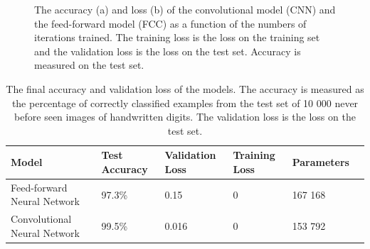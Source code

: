 \documentclass[a4paper, twoside]{article}
\begin{document}
\begin{figure}[h]
    \centering
    \caption{The accuracy (a) and loss (b) of the convolutional model (CNN) and the feed-forward model (FCC) as a function of the numbers of iterations trained. The training loss is the loss on the training set and the validation loss is the loss on the test set. Accuracy is measured on the test set.} \label{figaccloss}
    
\end{figure}
\begin{table}[h]
\begin{center}
    \begin{tabular}{| l | l | l | l | l | l |}
    \hline
    Model & Test Accuracy & Validation Loss & Training Loss & Parameters\\ \hline
    Feed-forward Neural Network & 97.3\% & 0.15 & 0 & 167 168 \\ \hline
    Convolutional Neural Network & 99.5\% & 0.016 & 0 & 153 792\\ \hline
    \end{tabular}
    \caption{The final accuracy and validation loss of the models. The accuracy is measured as the percentage of correctly classified examples from the test set of 10 000 never before seen images of handwritten digits. The validation loss is the loss on the test set.} \label{tablemnist}
\end{center}
\end{table}
\end{document}
